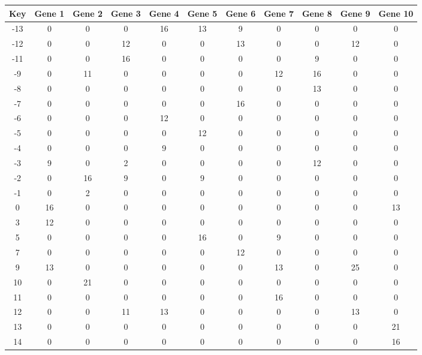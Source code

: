 \begin{tabular}{|c|c|c|c|c|c|c|c|c|c|c|}
\hline
Key & Gene 1 & Gene 2 & Gene 3 & Gene 4 & Gene 5 & Gene 6 & Gene 7 & Gene 8 & Gene 9 & Gene 10 \\
\hline
-13 & 0 & 0 & 0 & 16 & 13 & 9 & 0 & 0 & 0 & 0 \\
-12 & 0 & 0 & 12 & 0 & 0 & 13 & 0 & 0 & 12 & 0 \\
-11 & 0 & 0 & 16 & 0 & 0 & 0 & 0 & 9 & 0 & 0 \\
-9 & 0 & 11 & 0 & 0 & 0 & 0 & 12 & 16 & 0 & 0 \\
-8 & 0 & 0 & 0 & 0 & 0 & 0 & 0 & 13 & 0 & 0 \\
-7 & 0 & 0 & 0 & 0 & 0 & 16 & 0 & 0 & 0 & 0 \\
-6 & 0 & 0 & 0 & 12 & 0 & 0 & 0 & 0 & 0 & 0 \\
-5 & 0 & 0 & 0 & 0 & 12 & 0 & 0 & 0 & 0 & 0 \\
-4 & 0 & 0 & 0 & 9 & 0 & 0 & 0 & 0 & 0 & 0 \\
-3 & 9 & 0 & 2 & 0 & 0 & 0 & 0 & 12 & 0 & 0 \\
-2 & 0 & 16 & 9 & 0 & 9 & 0 & 0 & 0 & 0 & 0 \\
-1 & 0 & 2 & 0 & 0 & 0 & 0 & 0 & 0 & 0 & 0 \\
0 & 16 & 0 & 0 & 0 & 0 & 0 & 0 & 0 & 0 & 13 \\
3 & 12 & 0 & 0 & 0 & 0 & 0 & 0 & 0 & 0 & 0 \\
5 & 0 & 0 & 0 & 0 & 16 & 0 & 9 & 0 & 0 & 0 \\
7 & 0 & 0 & 0 & 0 & 0 & 12 & 0 & 0 & 0 & 0 \\
9 & 13 & 0 & 0 & 0 & 0 & 0 & 13 & 0 & 25 & 0 \\
10 & 0 & 21 & 0 & 0 & 0 & 0 & 0 & 0 & 0 & 0 \\
11 & 0 & 0 & 0 & 0 & 0 & 0 & 16 & 0 & 0 & 0 \\
12 & 0 & 0 & 11 & 13 & 0 & 0 & 0 & 0 & 13 & 0 \\
13 & 0 & 0 & 0 & 0 & 0 & 0 & 0 & 0 & 0 & 21 \\
14 & 0 & 0 & 0 & 0 & 0 & 0 & 0 & 0 & 0 & 16 \\
\hline
\end{tabular}